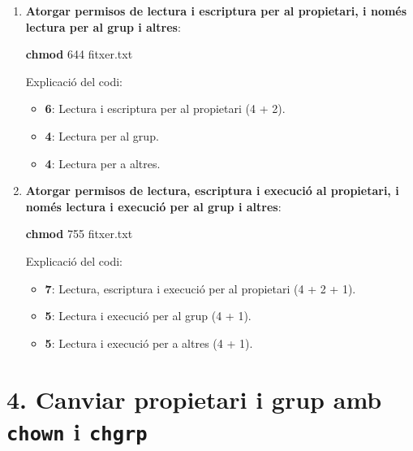 \documentclass[
  a4paper,
]{article}
\newenvironment{Shaded}{\begin{snugshade}}{\end{snugshade}}
\newcommand{\FunctionTok}[1]{\textcolor[rgb]{0.13,0.29,0.53}{\textbf{#1}}}
\newcommand{\NormalTok}[1]{#1}
\providecommand{\tightlist}{%
  \setlength{\itemsep}{0pt}\setlength{\parskip}{0pt}}
\begin{document}
\begin{enumerate}
\def\labelenumi{\arabic{enumi}.}
\item
  \textbf{Atorgar permisos de lectura i escriptura per al propietari, i
  només lectura per al grup i altres}:

\begin{Shaded}
\begin{Highlighting}[]
\FunctionTok{chmod}\NormalTok{ 644 fitxer.txt}
\end{Highlighting}
\end{Shaded}

  Explicació del codi:

  \begin{itemize}
  \tightlist
  \item
    \textbf{6}: Lectura i escriptura per al propietari (4 + 2).
  \item
    \textbf{4}: Lectura per al grup.
  \item
    \textbf{4}: Lectura per a altres.
  \end{itemize}
\item
  \textbf{Atorgar permisos de lectura, escriptura i execució al
  propietari, i només lectura i execució per al grup i altres}:

\begin{Shaded}
\begin{Highlighting}[]
\FunctionTok{chmod}\NormalTok{ 755 fitxer.txt}
\end{Highlighting}
\end{Shaded}

  Explicació del codi:

  \begin{itemize}
  \tightlist
  \item
    \textbf{7}: Lectura, escriptura i execució per al propietari (4 + 2
    + 1).
  \item
    \textbf{5}: Lectura i execució per al grup (4 + 1).
  \item
    \textbf{5}: Lectura i execució per a altres (4 + 1).
  \end{itemize}
\end{enumerate}

\section{\texorpdfstring{4. Canviar propietari i grup amb \texttt{chown}
i
\texttt{chgrp}}{4. Canviar propietari i grup amb chown i chgrp}}\label{canviar-propietari-i-grup-amb-chown-i-chgrp}
\end{document}
